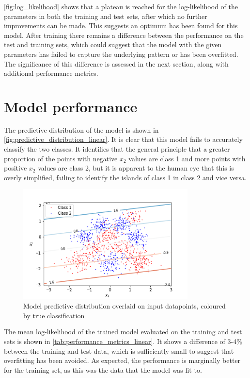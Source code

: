 \documentclass[a4paper]{article}
\begin{document}
    \autoref{fig:log_likelihood} shows that a plateau is reached for the log-likelihood of the parameters in both the
    training and test sets, after which no further improvements can be made. This suggests an optimum has been found for
    this model. After training there remains a difference between the performance on the test and training sets, which
    could suggest that the model with the given parameters has failed to capture the underlying pattern or has been
    overfitted. The significance of this difference is assessed in the next section, along with additional performance
    metrics.

    \section{Model performance}\label{sec:model-performance}
    The predictive distribution of the model is shown in \autoref{fig:predictive_distribution_linear}. It is clear that
    this model fails to accurately classify the two classes. It identifies that the general principle that a greater
    proportion of the points with negative $x_2$ values are class 1 and more points with positive $x_2$ values are class
    2, but it is apparent to the human eye that this is overly simplified, failing to identify the islands of class 1 in
    class 2 and vice versa.

    \begin{figure}[h]
        \label{fig:predictive_distribution_linear}
        \centering
        \includegraphics[width=0.8\textwidth]{plots/predictive_distribution_linear.png}
        \caption{Model predictive distribution overlaid on input datapoints, coloured by true classification}
    \end{figure}

    The mean log-likelihood of the trained model evaluated on the training and test sets is shown in
    \autoref{tab:performance_metrics_linear}. It shows a difference of 3-4\% between the training and test data, which is
    sufficiently small to suggest that overfitting has been avoided. As expected, the performance is marginally better
    for the training set, as this was the data that the model was fit to.
\end{document}
